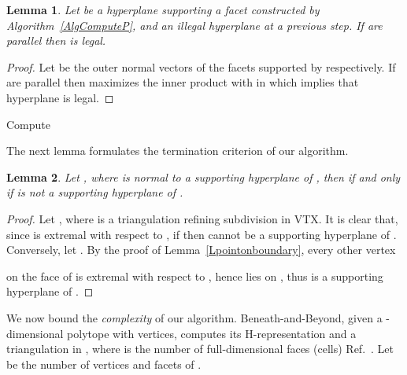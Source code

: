 \documentclass{article}
\newtheorem{lemma}{Lemma}
\newcommand\refcite[1]{\citealp{#1}} \newcommand\citess[1]{\textsuperscript{\textup{\citealp{#1}}}}
\begin{document}
\begin{lemma}\label{Noparallel}
Let  be a hyperplane supporting a facet constructed
by Algorithm~\ref{AlgComputeP}, and  an illegal hyperplane
at a previous step.
If  are parallel then  is legal.
\end{lemma}
\begin{proof}
Let  be the outer normal vectors of the 
facets supported by  respectively.
If  are parallel then  maximizes the 
inner product with  in 
which implies that hyperplane  is legal.
\end{proof}
\begin{algorithm}[ht]
\BlankLine
  \BlankLine\BlankLine
  
  	\hspace{1em}
  \; 
  \lForEach{}{\hspace{2em}}
  \BlankLine
  \Return \;
  \BlankLine
  \caption{\label{AlgComputeP} Compute }
\end{algorithm} 

The next lemma formulates the termination criterion of our algorithm.

\begin{lemma}\label{Lwcriterion} 
Let , where  is
normal to a supporting hyperplane  of ,
then  if and only if  is not a supporting hyperplane of .
\end{lemma}

\begin{proof}
Let , where  is a
triangulation refining subdivision  in {VTX}.
It is clear that, since  is extremal with respect to ,
if  then  cannot be a supporting hyperplane of .
Conversely, let .
By the proof of Lemma~\ref{Lpointonboundary}, every other vertex
 
on the face of  is extremal with respect to , hence lies on ,
thus  is a supporting hyperplane of .
\end{proof}

We now bound the {\it complexity} of our algorithm.
Beneath-and-Beyond, given a -dimensional polytope with
 vertices, computes its H-representation and a triangulation
in , where  is the number of full-dimensional faces (cells)
Ref.~\refcite{Josw03bb}.
Let  be the number of vertices and facets of .
\end{document}
